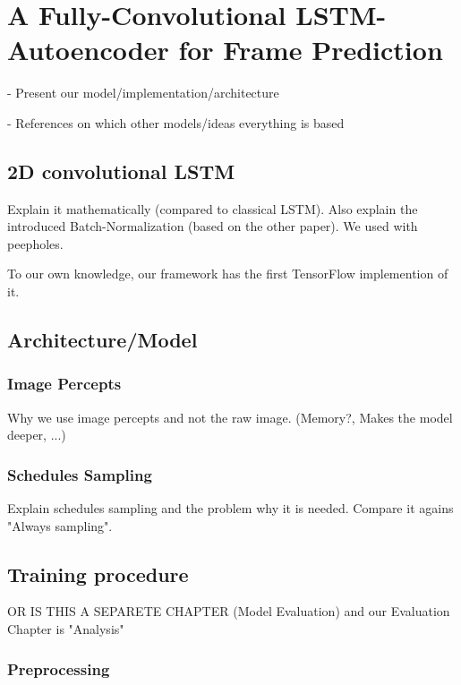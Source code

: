 
\chapter{A Fully-Convolutional LSTM-Autoencoder for Frame Prediction} \label{chapter:implementation}

- Present our model/implementation/architecture

- References on which other models/ideas everything is based

\section{2D convolutional LSTM}

Explain it mathematically (compared to classical LSTM).
Also explain the introduced Batch-Normalization (based on the other paper).
We used with peepholes.

To our own knowledge, our framework has the first TensorFlow implemention of it.


\section{Architecture/Model}


\subsection{Image Percepts}

Why we use image percepts and not the raw image.
(Memory?, Makes the model deeper, ...)

\subsection{Schedules Sampling}

Explain schedules sampling and the problem why it is needed. Compare it agains "Always sampling".


\section{Training procedure}

OR IS THIS A SEPARETE CHAPTER (Model Evaluation) and our Evaluation Chapter is "Analysis"

\subsection{Preprocessing}

